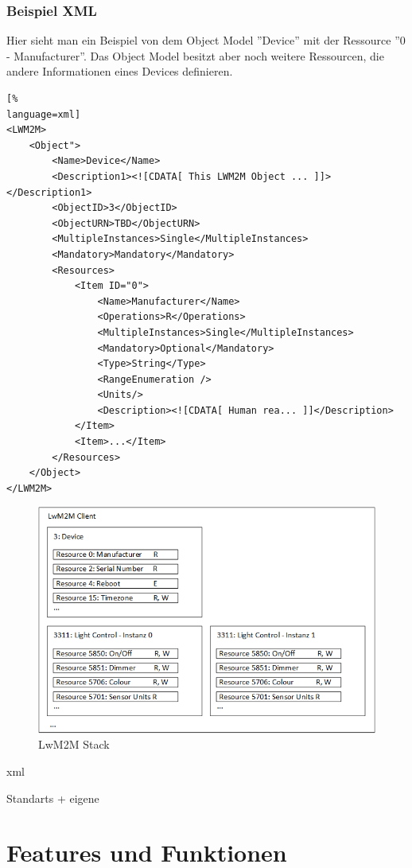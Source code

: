 \subsubsection{Beispiel XML}
Hier sieht man ein Beispiel von dem Object Model ''Device'' mit der Ressource ''0 - Manufacturer''. Das Object Model besitzt aber noch weitere Ressourcen, die andere Informationen eines Devices definieren.
\begin{lstlisting}[%
language=xml]
<LWM2M>
	<Object">
		<Name>Device</Name>
		<Description1><![CDATA[ This LWM2M Object ... ]]></Description1>
		<ObjectID>3</ObjectID>
		<ObjectURN>TBD</ObjectURN>
		<MultipleInstances>Single</MultipleInstances>
		<Mandatory>Mandatory</Mandatory>
		<Resources>
			<Item ID="0">
				<Name>Manufacturer</Name>
				<Operations>R</Operations>
				<MultipleInstances>Single</MultipleInstances>
				<Mandatory>Optional</Mandatory>
				<Type>String</Type>
				<RangeEnumeration />
				<Units/>
				<Description><![CDATA[ Human rea... ]]</Description>
			</Item>
			<Item>...</Item>
		</Resources>
	</Object>
</LWM2M>
\end{lstlisting}

\begin{figure}[H]
\includegraphics[scale=0.65]{images/lwm2m/lwm2m_client.png}
\caption{LwM2M Stack}
\end{figure}

xml

Standarts + eigene

\section{Features und Funktionen}

